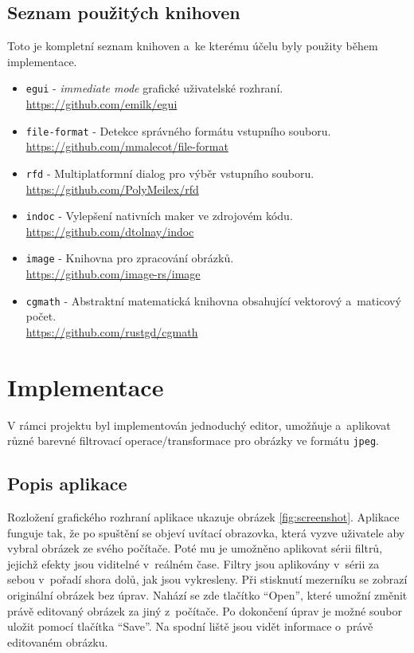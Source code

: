 \documentclass[11pt, a4paper, titlepage]{article}
\renewcommand{\uv}[1]{``#1''}
\begin{document}
\subsection{Seznam použitých knihoven}
Toto je kompletní seznam knihoven a~ke kterému účelu byly použity během implementace.
\begin{itemize}
    \item {
        \texttt{egui} - \emph{immediate mode} grafické uživatelské rozhraní.\\
        {\small\url{https://github.com/emilk/egui}}
    }
    \item {
        \texttt{file-format} - Detekce správného formátu vstupního souboru.\\
        {\small\url{https://github.com/mmalecot/file-format}}
    }
    \item {
        \texttt{rfd} - Multiplatformní dialog pro výběr vstupního souboru.\\
        {\small\url{https://github.com/PolyMeilex/rfd}}
    }
    \item {
        \texttt{indoc} - Vylepšení nativních maker ve zdrojovém kódu.\\
        {\small\url{https://github.com/dtolnay/indoc}}
    }
    \item {
        \texttt{image} - Knihovna pro zpracování obrázků.\\
        {\small\url{https://github.com/image-rs/image}}
    }
    \item {
        \texttt{cgmath} - Abstraktní matematická knihovna obsahující vektorový a~maticový počet.\\
        {\small\url{https://github.com/rustgd/cgmath}}
    }
\end{itemize}

\section{Implementace}
V rámci projektu byl implementován jednoduchý editor, umožňuje a~aplikovat různé barevné filtrovací operace/transformace pro obrázky ve formátu \texttt{jpeg}.

\subsection{Popis aplikace}

Rozložení grafického rozhraní aplikace ukazuje obrázek \ref{fig:screenshot}.
Aplikace funguje tak, že po spuštění se objeví uvítací obrazovka, která vyzve uživatele aby vybral obrázek ze svého počítače.
Poté mu je umožněno aplikovat sérii filtrů, jejichž efekty jsou viditelné v~reálném čase.
Filtry jsou aplikovány v~sérii za sebou v~pořadí shora dolů, jak jsou vykresleny.
Při stisknutí mezerníku se zobrazí originální obrázek bez úprav.
Nahází se zde tlačítko \uv{Open}, které umožní změnit právě editovaný obrázek za jiný z~počítače.
Po dokončení úprav je možné soubor uložit pomocí tlačítka \uv{Save}.
Na spodní liště jsou vidět informace o~právě editovaném obrázku.
\end{document}

